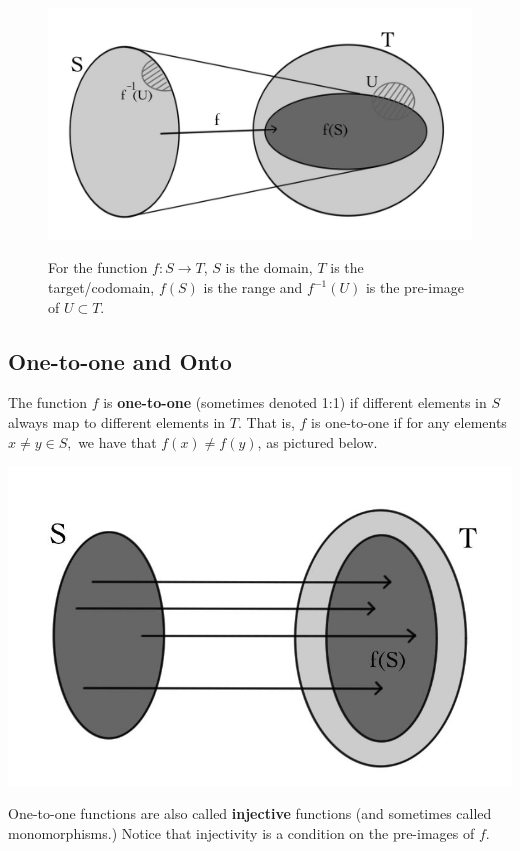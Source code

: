\begin{figure}
\begin{center}
\includegraphics[alt={A function f takes a set S to f(S) in T.  The set U in T comes from f^{-1}(U) in S.},scale=.25]{functions.jpg}
\end{center}
\caption{For the function $f:S\to T$, $S$ is the domain, $T$ is the target/codomain, $f(S)$ is the range and $f^{-1}(U)$ is the
pre-image of $U\subset T$.}
\end{figure}

\subsection{ One-to-one and Onto}
The function \(f\) is {\bfseries one-to-one} (sometimes denoted 1:1) if different elements in \(S\) always map to different elements in \(T\). That is, \(f\) is one-to-one if for any elements \(x \neq y \in S,\) we have that \(f(x) \neq f(y)\), as pictured below.
\begin{center}
\includegraphics[alt={The function f takes five different points in S to five different points in f(S) in T.},scale=.25]{121.jpg}
\end{center} 
One-to-one functions are also called {\bfseries injective} functions (and sometimes called monomorphisms.) Notice that injectivity is a condition on the pre-images of \(f\).

